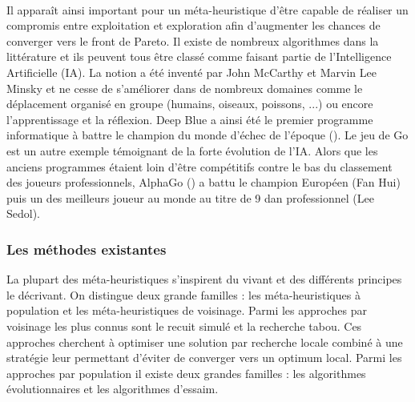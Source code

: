 \paragraph{} %
Il apparaît ainsi important pour un méta-heuristique d’être capable de réaliser
un compromis entre exploitation et exploration afin d’augmenter les chances de
converger vers le front de Pareto. Il existe de nombreux algorithmes dans la littérature
et ils peuvent tous être classé comme faisant partie de l’Intelligence Artificielle (IA).
La notion a été inventé par John McCarthy et Marvin Lee Minsky et ne cesse de s’améliorer
dans de nombreux domaines comme le déplacement organisé en groupe (humains, oiseaux, poissons, ...)
ou encore l’apprentissage et la réflexion. Deep Blue a ainsi été le premier programme
informatique à battre le champion du monde d’échec de l’époque (\cite{Hsu199970}).
Le jeu de Go est un autre exemple témoignant de la forte évolution de l’IA. Alors que
les anciens programmes étaient loin d’être compétitifs contre le bas du classement
des joueurs professionnels, AlphaGo (\cite{Silver2016484}) a battu le champion Européen (Fan Hui)
puis un des meilleurs joueur au monde au titre de 9 dan professionnel (Lee Sedol).


\subsubsection{Les méthodes existantes} %
\label{ssub:les_methodes_existantes}
La plupart des méta-heuristiques s’inspirent du vivant et des différents principes
le décrivant. On distingue deux grande familles : les méta-heuristiques à population
et les méta-heuristiques de voisinage. Parmi les approches par voisinage les plus
connus sont le recuit simulé et la recherche tabou. Ces approches cherchent à optimiser
une solution par recherche locale combiné à une stratégie leur permettant d’éviter
de converger vers un optimum local. Parmi les approches par population il existe
deux grandes familles : les algorithmes évolutionnaires et les algorithmes d’essaim.

